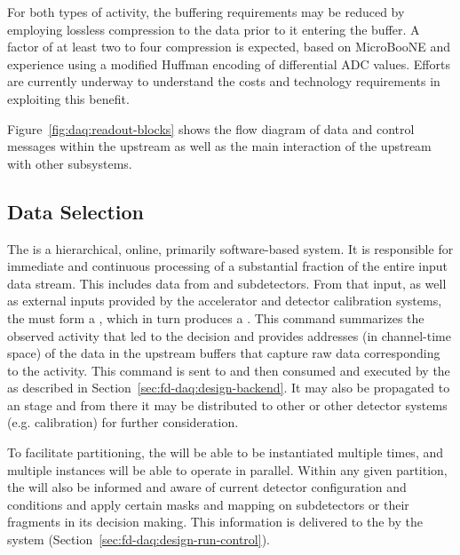 \begin{itemize}
For both types of activity, the buffering requirements may be reduced by
employing lossless compression to the data prior to it entering the buffer. A
factor of at least two to four compression is expected, based on
MicroBooNE \cite{bib:uBsnreadout2019} 
and  experience using a modified Huffman encoding of
differential ADC values.  Efforts are currently underway to understand the
costs and technology requirements in exploiting this benefit.

\end{itemize}

Figure~\ref{fig:daq:readout-blocks} shows the flow diagram of data and control messages within the upstream  as well as the main interaction of the upstream  with other subsystems.

\subsection{Data Selection}
\label{sec:sp-daq:design-data-selection}

The   is a hierarchical, online, primarily
software-based system. It is responsible for immediate and continuous processing of a substantial fraction of the entire input data stream. 
This includes data from  and  subdetectors.
From that input, as well as external inputs provided by
the accelerator and detector calibration systems, the  must form a ,
which in turn produces a .
This command summarizes the observed activity that led to the decision
and provides addresses (in channel-time space) of the data in the
upstream  buffers that capture raw data
corresponding to the activity.
This command is sent to and then consumed and executed by the  as described in Section~\ref{sec:fd-daq:design-backend}. 
It may also be propagated to an  stage and from there it may be
distributed to other  or other detector systems
(e.g. calibration) for further consideration.

To facilitate partitioning, the   will be
able to be instantiated multiple times, and multiple instances will be
able to operate in parallel. Within any
given partition, the  will also be
informed and aware of current detector configuration and conditions and
apply certain masks and mapping on subdetectors or their fragments in
its decision making. This information is delivered to the
 by the  system (Section~\ref{sec:fd-daq:design-run-control}).

